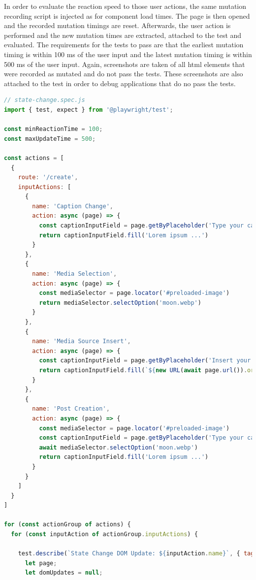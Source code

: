\documentclass[a4paper, 12pt]{article}
\begin{document}
In order to evaluate the reaction speed to those user actions, the same mutation recording script is injected as for component load times.
The page is then opened and the recorded mutation timings are reset. Afterwards, the user action is performed and the new mutation times are extracted, attached to the test and evaluated.
The requirements for the tests to pass are that the earliest mutation timing is within 100 ms of the user input and the latest mutation timing is within 500 ms of the user input.
Again, screenshots are taken of all \acrshort{html} elements that were recorded as mutated and do not pass the tests.
These screenshots are also attached to the test in order to debug applications that do no pass the tests.

\vspace{1cm}
\begin{lstlisting}[caption={Test file for component update times}, label={lst:state-change-spec}, language=JavaScript, escapechar=°]
// state-change.spec.js
import { test, expect } from '@playwright/test';

const minReactionTime = 100;
const maxUpdateTime = 500;

const actions = [
  {
    route: '/create',
    inputActions: [
      {
        name: 'Caption Change',
        action: async (page) => {
          const captionInputField = page.getByPlaceholder('Type your caption here')
          return captionInputField.fill('Lorem ipsum ...')
        }
      },
      {
        name: 'Media Selection',
        action: async (page) => {
          const mediaSelector = page.locator('#preloaded-image')
          return mediaSelector.selectOption('moon.webp')
        }
      },
      {
        name: 'Media Source Insert',
        action: async (page) => {
          const captionInputField = page.getByPlaceholder('Insert your media URL here...')
          return captionInputField.fill(`${new URL(await page.url()).origin}/abstract-circles.webp`)
        }
      },
      {
        name: 'Post Creation',
        action: async (page) => {
          const mediaSelector = page.locator('#preloaded-image')
          const captionInputField = page.getByPlaceholder('Type your caption here')
          await mediaSelector.selectOption('moon.webp')
          return captionInputField.fill('Lorem ipsum ...')
        }
      }
    ]
  }
]

for (const actionGroup of actions) {
  for (const inputAction of actionGroup.inputActions) {

    test.describe(`State Change DOM Update: ${inputAction.name}`, { tag: [`@${inputAction.name.replace(/\s/g, '')}`, '@stateChange'] }, () => {
      let page;
      let domUpdates = null;


\end{lstlisting}
\end{document}
